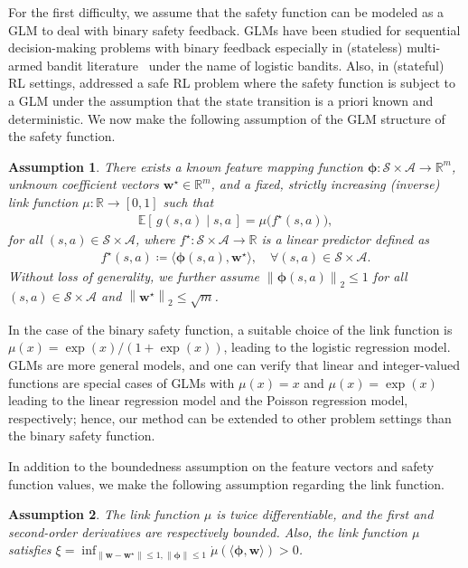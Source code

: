 \documentclass[letterpaper]{article} %
\newtheorem{assumption}{Assumption}
\newcommand{\E}{\mathbb{E}}
\newcommand{\R}{\mathbb{R}}
\newcommand{\cA}{\mathcal{A}}
\newcommand{\cS}{\mathcal{S}}
\newcommand{\bphi}{\bm{\phi}}
\newcommand{\iprod}[2]{\langle #1, #2 \rangle}
\newcommand{\norm}[1]{\left\|{#1}\right\|_2}
\begin{document}
For the first difficulty, we assume that the safety function can be modeled as a GLM to deal with binary safety feedback.
GLMs have been studied for sequential decision-making problems with binary feedback especially in (stateless) multi-armed bandit literature~\citep{filippi2010parametric,li2017provably,faury2020improved} under the name of logistic bandits.
Also, in (stateful) RL settings, \citet{wachi2021safe} addressed a safe RL problem where the safety function is subject to a GLM under the assumption that the state transition is a priori known and deterministic.
We now make the following assumption of the GLM structure of the safety function.
%
\begin{assumption}
\label{assumption:linear}
There exists a known feature mapping function $\bphi: \cS \times \cA \rightarrow \R^m$, unknown coefficient vectors $\bm{w}^\star \in \R^m$, and a fixed, strictly increasing (inverse) link function $\mu: \R \rightarrow [0, 1]$ such that
%
\begin{align}
\label{eq:gl_safety}
    \E[\, g(s, a) \mid s, a \,] = \mu\bigl(f^\star(s,a)\bigr),
\end{align}
%
for all $(s, a) \in \cS \times \cA$,
where $f^\star: \cS \times \cA \rightarrow \R$ is a linear predictor defined as
%
\begin{align}
    f^\star(s, a) \coloneqq \iprod{\bphi(s,a)}{\bm{w}^\star}, \quad \forall (s, a) \in \cS \times \cA.
\end{align}
%
Without loss of generality, we further assume $\norm{\bphi(s, a)} \le 1$ for all $(s,a) \in \cS \times \cA$ and $\norm{\bm{w}^\star} \le \sqrt{m}$.
\end{assumption}
%
\noindent
In the case of the binary safety function, a suitable choice of the link function is $\mu(x) = \exp(x)/(1 + \exp(x))$, leading to the logistic regression model.
GLMs are more general models, and one can verify that linear and integer-valued functions are special cases of GLMs with $\mu(x) = x$ and $\mu(x) = \exp(x)$ leading to the linear regression model and the Poisson regression model, respectively; hence, our method can be extended to other problem settings than the binary safety function.

In addition to the boundedness assumption on the feature vectors and safety function values, we make the following assumption regarding the link function.
%
\begin{assumption}
\label{assumption:link}
The link function $\mu$ is twice differentiable, and the first and second-order derivatives are respectively bounded.
Also, the link function $\mu$ satisfies $\xi = \inf_{\| \bm{w} - \bm{w}^\star \| \le 1, \|\bm{\phi}\| \le 1} \dot{\mu}(\iprod{\bm{\phi}} {\bm{w}}) > 0$.
\end{assumption}
\end{document}
